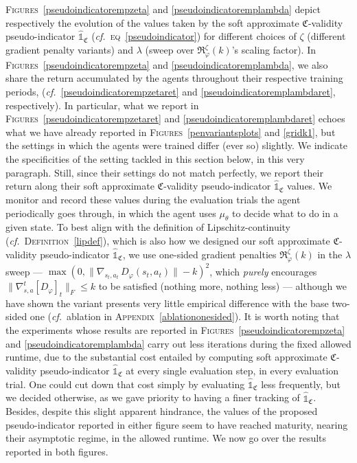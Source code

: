 \textsc{Figures}~\ref{pseudoindicatorempzeta} and \ref{pseudoindicatoremplambda}
depict respectively the evolution of the values taken by the
soft approximate $\mathfrak{C}$-validity pseudo-indicator $\widehat{\mathds{1}}_\mathfrak{C}$
(\textit{cf.}~\textsc{eq}~\ref{pseudoindicator})
for different choices of $\zeta$ (different gradient penalty variants)
and $\lambda$ (sweep over $\mathfrak{R}_\varphi^\zeta (k)$'s scaling factor).
In \textsc{Figures}~\ref{pseudoindicatorempzeta} and \ref{pseudoindicatoremplambda},
we also share the return accumulated by the agents throughout their respective training periods,
(\textit{cf.}~\ref{pseudoindicatorempzetaret} and \ref{pseudoindicatoremplambdaret}, respectively).
In particular,
what we report in \textsc{Figures}~\ref{pseudoindicatorempzetaret} and \ref{pseudoindicatoremplambdaret}
echoes what we have already reported in \textsc{Figures}~\ref{penvariantsplots} and \ref{gridk1},
but the settings in which the agents were trained differ (ever so) slightly.
We indicate the specificities of the setting tackled in this section below, in this very paragraph.
Still, since their settings do not match perfectly,
we report their return along their
soft approximate $\mathfrak{C}$-validity pseudo-indicator $\widehat{\mathds{1}}_\mathfrak{C}$ values.
We monitor and record these values during the evaluation trials the agent periodically goes through,
in which the agent uses $\mu_\theta$ to decide what to do in a given state.
To best align with the definition of Lipschitz-continuity
(\textit{cf.}~\textsc{Definition}~\ref{lipdef}),
which is also how we designed our
soft approximate $\mathfrak{C}$-validity pseudo-indicator $\widehat{\mathds{1}}_\mathfrak{C}$,
we use one-sided gradient penalties $\mathfrak{R}_\varphi^\zeta (k)$ in the $\lambda$ sweep ---
$\max (0, \lVert \nabla_{s_t,a_t} \, D_\varphi (s_t,a_t) \rVert - k)^2$,
which \emph{purely}
encourages $\lVert \nabla_{s,a}^t[D_\varphi]_t \rVert _F \leq k$ to be satisfied
(nothing more, nothing less) ---
although we have shown the variant presents very little empirical difference with the base two-sided one
(\textit{cf.}~ablation in \textsc{Appendix}~\ref{ablationonesided}).
It is worth noting that the experiments whose results are reported in
\textsc{Figures}~\ref{pseudoindicatorempzeta} and \ref{pseudoindicatoremplambda}
carry out less iterations during the fixed allowed runtime,
due to the substantial cost entailed by computing
soft approximate $\mathfrak{C}$-validity pseudo-indicator $\widehat{\mathds{1}}_\mathfrak{C}$
at every single evaluation step, in every evaluation trial.
One could cut down that cost simply by evaluating $\widehat{\mathds{1}}_\mathfrak{C}$ less frequently,
but we decided otherwise, as we gave priority to having a finer tracking of $\widehat{\mathds{1}}_\mathfrak{C}$.
Besides, despite this slight apparent hindrance, the values of the proposed
pseudo-indicator reported in either figure seem to have reached maturity,
nearing their asymptotic regime,
in the allowed runtime.
We now go over the results reported in both figures.

